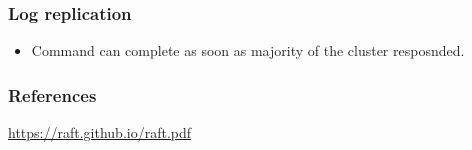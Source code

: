 \documentclass[10pt,utf8]{beamer}
\begin{document}
\begin{frame}
	\frametitle{Log replication}
	\begin{itemize}
		\item Command can complete as soon as majority of the cluster resposnded.
	\end{itemize}
\end{frame}


\begin{frame}
	\frametitle{References}
	\begin{thebibliography}{9}
		 \url{https://raft.github.io/raft.pdf}
	\end{thebibliography}
\end{frame}
\end{document}
